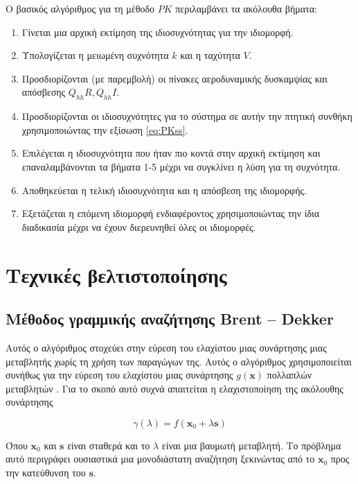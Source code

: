 Ο βασικός αλγόριθμος για τη μέθοδο $PK$ περιλαμβάνει τα ακόλουθα βήματα:

\begin{enumerate} 
  \def\labelenumi{\arabic{enumi}.} 
  \item Γίνεται μια αρχική εκτίμηση της ιδιοσυχνότητας για την ιδιομορφή. 
  \item Υπολογίζεται η μειωμένη συχνότητα $k$ και η ταχύτητα $V$.
  \item Προσδιορίζονται (με παρεμβολή) οι πίνακες αεροδυναμικής δυσκαμψίας και απόσβεσης $Q_{hh}{R}, Q_{hh}{I}$. 
  \item Προσδιορίζονται οι ιδιοσυχνότητες για το σύστημα σε αυτήν την πτητική συνθήκη χρησιμοποιώντας την εξίσωση \eqref{eq:PKss}. 
  \item Επιλέγεται η ιδιοσυχνότητα που ήταν πιο κοντά στην αρχική εκτίμηση και επαναλαμβάνονται τα βήματα 1-5 μέχρι να συγκλίνει η λύση για τη συχνότητα.
  \item Αποθηκεύεται η τελική ιδιοσυχνότητα και η απόσβεση της ιδιομορφής. 
  \item Εξετάζεται η επόμενη ιδιομορφή ενδιαφέροντος χρησιμοποιώντας την ίδια διαδικασία μέχρι να έχουν διερευνηθεί όλες οι ιδιομορφές. 
\end{enumerate}


\section{Τεχνικές βελτιστοποίησης} \label{optimization-techniques}

\subsection{Μέθοδος γραμμικής αναζήτησης \textlatin{Brent -- Dekker}} \label{brents-dekker-line-search-method}

Αυτός ο αλγόριθμος στοχεύει στην εύρεση του ελαχίστου μιας συνάρτησης μιας μεταβλητής χωρίς τη χρήση των παραγώγων της. Αυτός ο αλγόριθμος χρησιμοποιείται συνήθως για την εύρεση του ελαχίστου μιας συνάρτησης $g\left( \mathbf{x} \right)$ πολλαπλών μεταβλητών \cite{brent1973}. Για το σκοπό αυτό συχνά απαιτείται η ελαχιστοποίηση της ακόλουθης συνάρτησης

\begin{equation}
    \label{eq:minfun}
\gamma(\lambda) = f(\mathbf{x}_{0} + \lambda\mathbf{s})
\end{equation}

Όπου $\mathbf{x}_0$ και $\mathbf{s}$ είναι σταθερά και το $\lambda$ είναι μια βαυμωτή μεταβλητή. Το πρόβλημα αυτό περιγράφει ουσιαστικά μια μονοδιάστατη αναζήτηση ξεκινώντας από το $\mathbf{x}_0$ προς την κατεύθυνση του $\mathbf{s}$.

